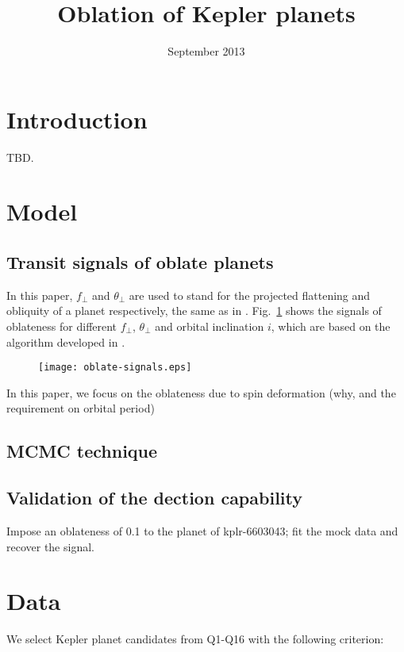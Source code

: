 \documentclass{emulateapj}
\title{Oblation of Kepler planets}
\author{}
\date{September 2013}
\begin{document}
\maketitle

\section{Introduction}

TBD.

\section{Model}
\subsection{Transit signals of oblate planets}

In this paper, $f_\perp$ and $\theta_\perp$ are used to stand for the projected flattening and obliquity of a planet respectively, the same as in \citet{Carter2010}. Fig.~\ref{oblate-signals} shows the signals of oblateness for different $f_\perp$, $\theta_\perp$ and orbital inclination $i$, which are based on the algorithm developed in \citet{Carter2010}.

\begin{figure}
\centering
\texttt{[image: oblate-signals.eps]}
\caption{} \label{oblate-signals}
\end{figure}

In this paper, we focus on the oblateness due to spin deformation (why, and the requirement on orbital period)



\subsection{MCMC technique}
\subsection{Validation of the dection capability}


Impose an oblateness of 0.1 to the planet of kplr-6603043; 
fit the mock data and recover the signal.

\section{Data}

We select Kepler planet candidates from Q1-Q16 with the following criterion: 
\end{document}
